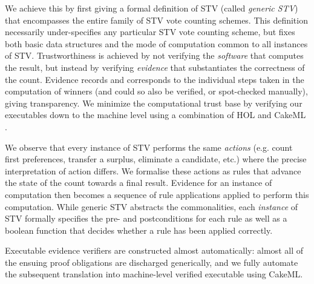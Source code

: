 \documentclass[10pt,conference]{IEEEtran}
\begin{document}

We achieve this by first giving a formal definition of STV (called \emph{generic STV}) 
that  encompasses the entire family of STV vote counting
schemes. This definition necessarily under-specifies any particular STV vote counting scheme, but fixes both basic data structures and the mode of computation common to all instances of STV. Trustworthiness is achieved by
not verifying the \emph{software} that computes the result, but instead by verifying \emph{evidence} that substantiates the correctness of the count. Evidence records and corresponds to the individual steps taken in the computation of winners 
(and could so also be verified, or spot-checked manually), giving transparency. We minimize the computational trust base by verifying our executables down to the machine level using a combination of HOL \cite{hol} and CakeML \cite{cake}. 

We observe that every instance of STV performs the same \emph{actions} (e.g. count first preferences, transfer a surplus, eliminate a candidate, etc.) where the precise interpretation of action differs. We formalise these actions as rules that advance the state of the count towards a final result. Evidence for an instance of computation then becomes a sequence of rule applications applied to perform this computation. While generic STV abstracts the commonalities, each \emph{instance} of STV formally specifies the
pre- and postconditions for each rule as well as a boolean function that decides whether a rule has been applied correctly. 

Executable evidence verifiers are constructed almost
automatically:  almost all of the ensuing proof obligations are discharged generically, and we fully  automate the subsequent translation into machine-level verified executable using CakeML.
\end{document}
